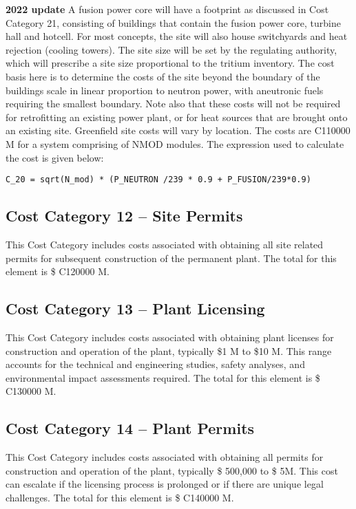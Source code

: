  \textbf{2022 update} 
A fusion power core will have a footprint as discussed in Cost Category 21, consisting of buildings that contain the fusion power core, turbine hall and hotcell. For most concepts, the site will also house switchyards and heat rejection (cooling towers). The site size will be set by the regulating authority, which will prescribe a site size proportional to the tritium inventory.  The cost basis here is to determine the costs of the site beyond the boundary of the buildings scale in linear proportion to neutron power, with aneutronic fuels requiring the smallest boundary.  Note also that these costs will not be required for retrofitting an existing power plant, or for heat sources that are brought onto an existing site.  Greenfield site costs will vary by location. The costs are C110000 M for a system comprising of NMOD modules. 
 The expression used to calculate the cost is given below: 
\begin{verbatim} 
C_20 = sqrt(N_mod) * (P_NEUTRON /239 * 0.9 + P_FUSION/239*0.9)\end{verbatim} 


\subsection*{Cost Category 12 – Site Permits} 
This Cost Category includes costs associated with obtaining all site related permits for subsequent construction of the permanent plant.  The total for this element is \$ C120000 M.

\subsection*{Cost Category 13 – Plant Licensing} 
This Cost Category includes costs associated with obtaining plant licenses for construction and operation of the plant, typically \$1 M to \$10 M. This range accounts for the technical and engineering studies, safety analyses, and environmental impact assessments required.  The total for this element is \$ C130000 M.

\subsection*{Cost Category 14 – Plant Permits} 
This Cost Category includes costs associated with obtaining all permits for construction and operation of the plant, typically \$ 500,000 to \$ 5M. This cost can escalate if the licensing process is prolonged or if there are unique legal challenges.  The total for this element is \$ C140000 M.

